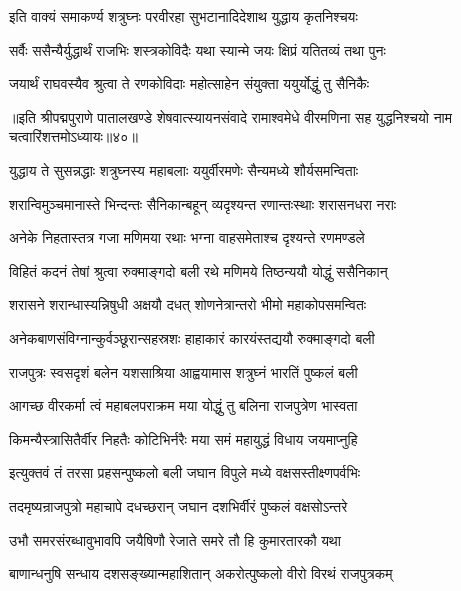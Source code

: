
\twolineshloka
{इति वाक्यं समाकर्ण्य शत्रुघ्नः परवीरहा}
{सुभटानादिदेशाथ युद्धाय कृतनिश्चयः}%

\twolineshloka
{सर्वैः ससैन्यैर्युद्धार्थं राजभिः शस्त्रकोविदैः}
{यथा स्यान्मे जयः क्षिप्रं यतितव्यं तथा पुनः}%

\twolineshloka
{जयार्थं राघवस्यैव श्रुत्वा ते रणकोविदाः}
{महोत्साहेन संयुक्ता ययुर्योद्धुं तु सैनिकैः}%

॥इति श्रीपद्मपुराणे पातालखण्डे शेषवात्स्यायनसंवादे रामाश्वमेधे वीरमणिना सह युद्धनिश्चयो नाम चत्वारिंशत्तमोऽध्यायः॥४०॥



\twolineshloka
{युद्धाय ते सुसन्नद्धाः शत्रुघ्नस्य महाबलाः}
{ययुर्वीरमणेः सैन्यमध्ये शौर्यसमन्विताः}%

\twolineshloka
{शरान्विमुञ्चमानास्ते भिन्दन्तः सैनिकान्बहून्}
{व्यदृश्यन्त रणान्तःस्थाः शरासनधरा नराः}%

\twolineshloka
{अनेके निहतास्तत्र गजा मणिमया रथाः}
{भग्ना वाहसमेताश्च दृश्यन्ते रणमण्डले}%

\twolineshloka
{विहितं कदनं तेषां श्रुत्वा रुक्माङ्गदो बली}
{रथे मणिमये तिष्ठन्ययौ योद्धुं ससैनिकान्}%

\twolineshloka
{शरासने शरान्धास्यन्निषुधी अक्षयौ दधत्}
{शोणनेत्रान्तरो भीमो महाकोपसमन्वितः}%

\twolineshloka
{अनेकबाणसंविग्नान्कुर्वञ्छूरान्सहस्रशः}
{हाहाकारं कारयंस्तद्ययौ रुक्माङ्गदो बली}%

\twolineshloka
{राजपुत्रः स्वसदृशं बलेन यशसाश्रिया}
{आह्वयामास शत्रुघ्नं भारतिं पुष्कलं बली}%


\twolineshloka
{आगच्छ वीरकर्मा त्वं महाबलपराक्रम}
{मया योद्धुं तु बलिना राजपुत्रेण भास्वता}%

\twolineshloka
{किमन्यैस्त्रासितैर्वीर निहतैः कोटिभिर्नरैः}
{मया समं महायुद्धं विधाय जयमाप्नुहि}%

\twolineshloka
{इत्युक्तवं तं तरसा प्रहसन्पुष्कलो बली}
{जघान विपुले मध्ये वक्षसस्तीक्ष्णपर्वभिः}%

\twolineshloka
{तदमृष्यन्राजपुत्रो महाचापे दधच्छरान्}
{जघान दशभिर्वीरं पुष्कलं वक्षसोऽन्तरे}%

\twolineshloka
{उभौ समरसंरब्धावुभावपि जयैषिणौ}
{रेजाते समरे तौ हि कुमारतारकौ यथा}%

\twolineshloka
{बाणान्धनुषि सन्धाय दशसङ्ख्यान्महाशितान्}
{अकरोत्पुष्कलो वीरो विरथं राजपुत्रकम्}%

